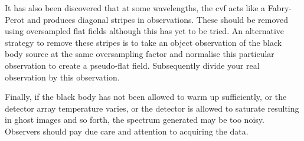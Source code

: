 \documentclass[a4paper]{book}
\renewcommand{\_}{{\tt\char'137}}
\begin{document}
It has also been discovered that at some wavelengths, the {\sc cvf} acts
like a Fabry-Perot and produces diagonal stripes in observations. These
should be removed using oversampled {\sc flat} fields although this has
yet to be tried. An alternative strategy to remove these stripes is to
take an {\sc object} observation of the black body source at the same
oversampling factor and normalise this particular observation to create a
pseudo-{\sc flat} field. Subsequently divide your real observation by this
observation. 

Finally, if the black body has not been allowed to warm up sufficiently,
or the detector array temperature varies, or the detector is allowed to
saturate resulting in ghost images and so forth, the spectrum generated
may be too noisy. Observers should pay due care and attention to acquiring
the data. 
\end{document}
